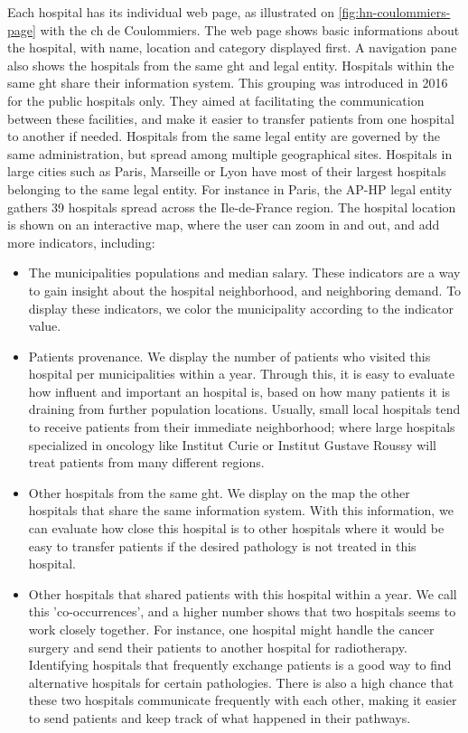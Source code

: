 Each hospital has its individual web page, as illustrated on
\cref{fig:hn-coulommiers-page} with the \ac{ch} de Coulommiers. The web page
shows basic informations about the hospital, with name, location and category
displayed first. A navigation pane also shows the hospitals from the same
\ac{ght} and legal entity. Hospitals within the same \ac{ght} share their
information system. This grouping was introduced in 2016 for the public
hospitals only. They aimed at facilitating the communication between these
facilities, and make it easier to transfer patients from one hospital to another
if needed. Hospitals from the same legal entity are governed by the same
administration, but spread among multiple geographical sites. Hospitals in large
cities such as Paris, Marseille or Lyon have most of their largest hospitals
belonging to the same legal entity. For instance in Paris, the AP-HP legal entity
gathers 39 hospitals spread across the Ile-de-France region.
The hospital location is shown on an interactive map, where the user can
zoom in and out, and add more indicators, including:

\begin{itemize}
    \item The municipalities populations and median salary. These indicators are
          a way to gain insight about the hospital neighborhood, and neighboring
          demand. To display these indicators, we color the municipality according
          to the indicator value.
    \item Patients provenance. We display the number of patients who visited
          this hospital per municipalities within a year. Through this, it is
          easy to evaluate how influent and important an hospital is, based on
          how many patients it is draining from further population locations.
          Usually, small local hospitals tend to receive patients from their
          immediate neighborhood; where large hospitals specialized in oncology
          like Institut Curie or Institut Gustave Roussy will treat patients
          from many different regions.
    \item Other hospitals from the same \ac{ght}. We display on the map the other
          hospitals that share the same information system. With this information,
          we can evaluate how close this hospital is to other hospitals where it
          would be easy to transfer patients if the desired pathology is not treated
          in this hospital.
    \item Other hospitals that shared patients with this hospital within a year.
          We call this 'co-occurrences', and a higher number shows that two
          hospitals seems to work closely together. For instance, one hospital
          might handle the cancer surgery and send their patients to another
          hospital for radiotherapy. Identifying hospitals that frequently
          exchange patients is a good way to find alternative hospitals for
          certain pathologies. There is also a high chance that these two
          hospitals communicate frequently with each other, making it easier
          to send patients and keep track of what happened in their pathways.
\end{itemize}

